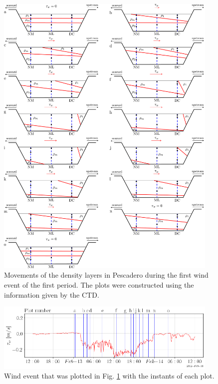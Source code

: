 \documentclass[tesis.tex]{subfiles}
\begin{document}
\newpage
\begin{figure}[h!]
    \centering
    \includegraphics[width=0.95\textwidth]{Imagenes/wind_event.png}
    \caption{Movements of the density layers in Pescadero during the first wind event of the first period. The plots were constructed using the information given by the CTD.}
    \label{fig:wevent}
\end{figure}

\newpage
\begin{figure}[h!]
    \centering
    \includegraphics[width=0.95\textwidth]{Imagenes/wind_event2.png}
    \caption{Wind event that was plotted in Fig. \ref{fig:wevent} with the instants of each plot. }
    \label{fig:wevent2}
\end{figure}
\end{document}
